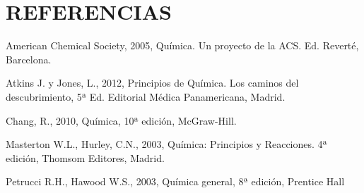 \section{REFERENCIAS} 

American Chemical Society, 2005, Química. Un proyecto de la ACS. Ed. Reverté, Barcelona.

Atkins J. y Jones, L., 2012, Principios de Química. Los caminos del descubrimiento, 5ª Ed. Editorial Médica Panamericana, Madrid.

Chang, R., 2010, Química, 10ª edición, McGraw-Hill.

Masterton W.L., Hurley, C.N., 2003, Química: Principios y Reacciones. 4ª edición, Thomsom Editores, Madrid.

Petrucci R.H., Hawood W.S., 2003, Química general, 8ª edición, Prentice Hall
